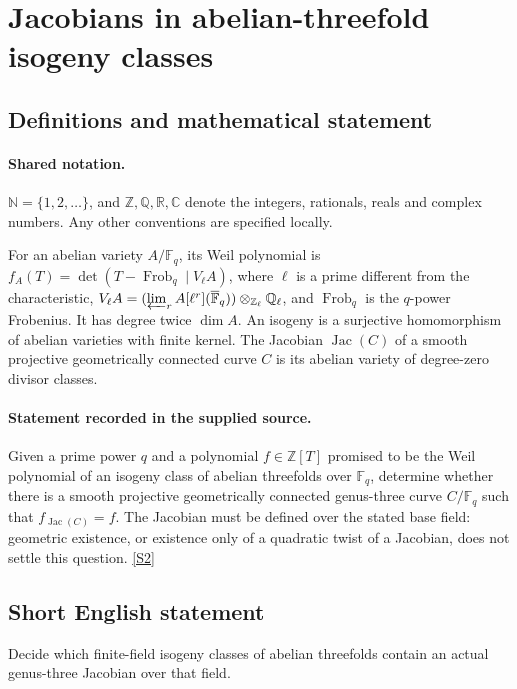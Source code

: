 \documentclass[11pt]{article}
\newcommand{\sref}[2]{\hyperlink{source:#1:#2}{[S#2]}}
\begin{document}
\section{Jacobians in abelian-threefold isogeny classes}\label{statement}

\subsection{Definitions and mathematical statement}

\paragraph{Shared notation.}$\mathbb N=\{1,2,\ldots\}$, and $\mathbb Z,\mathbb Q,\mathbb R,\mathbb C$ denote the integers, rationals, reals and complex numbers. Any other conventions are specified locally.


For an abelian variety $A/\mathbb F_q$, its Weil polynomial is $f_A(T)=\det(T-\operatorname{Frob}_q\mid V_\ell A)$, where $\ell$ is a prime different from the characteristic, $V_\ell A=(\varprojlim_r A[\ell^r](\overline{\mathbb F}_q))\otimes_{\mathbb Z_\ell}\mathbb Q_\ell$, and $\operatorname{Frob}_q$ is the $q$-power Frobenius. It has degree twice $\dim A$. An isogeny is a surjective homomorphism of abelian varieties with finite kernel. The Jacobian $\operatorname{Jac}(C)$ of a smooth projective geometrically connected curve $C$ is its abelian variety of degree-zero divisor classes.
\paragraph{Statement recorded in the supplied source.}
Given a prime power $q$ and a polynomial $f\in\mathbb Z[T]$ promised to be the Weil polynomial of an isogeny class of abelian threefolds over $\mathbb F_q$, determine whether there is a smooth projective geometrically connected genus-three curve $C/\mathbb F_q$ such that $f_{\operatorname{Jac}(C)}=f$. The Jacobian must be defined over the stated base field: geometric existence, or existence only of a quadratic twist of a Jacobian, does not settle this question. \sref{statement}{2}

\subsection{Short English statement}
Decide which finite-field isogeny classes of abelian threefolds contain an actual genus-three Jacobian over that field.
\end{document}
